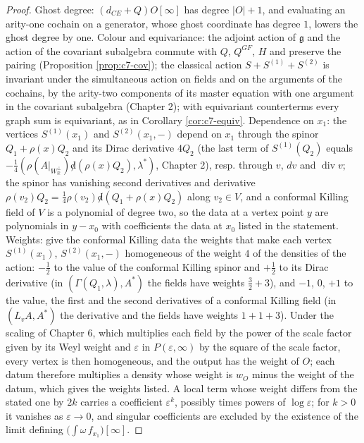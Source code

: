 \begin{proof}
Ghost degree: $(d_{CE}+Q)O[\infty]$ has degree $|O|+1$, and evaluating an arity-one cochain on a generator, whose ghost coordinate has degree $1$, lowers the ghost degree by one. Colour and equivariance: the adjoint action of $\mathfrak g$ and the action of the covariant subalgebra commute with $Q$, $Q^{GF}$, $H$ and preserve the pairing (Proposition \ref{prop:c7-cov}); the classical action $S+S^{(1)}+S^{(2)}$ is invariant under the simultaneous action on fields and on the arguments of the cochains, by the arity-two components of its master equation with one argument in the covariant subalgebra (Chapter 2); with equivariant counterterms every graph sum is equivariant, as in Corollary \ref{cor:c7-equiv}. Dependence on $x_1$: the vertices $S^{(1)}(x_1)$ and $S^{(2)}(x_1,-)$ depend on $x_1$ through the spinor $Q_1+\rho(x)Q_2$ and its Dirac derivative $4Q_2$ (the last term of $S^{(1)}(Q_2)$ equals $-\tfrac14(\rho(A|_{W_{\mathbb R}^\perp}){\not d}(\rho(x)Q_2),\lambda^*)$, Chapter 2), resp. through $v$, $dv$ and $\operatorname{div}v$; the spinor has vanishing second derivatives and derivative $\rho(v_2)Q_2=\tfrac14\rho(v_2){\not d}(Q_1+\rho(x)Q_2)$ along $v_2\in V$, and a conformal Killing field of $V$ is a polynomial of degree two, so the data at a vertex point $y$ are polynomials in $y-x_0$ with coefficients the data at $x_0$ listed in the statement. Weights: give the conformal Killing data the weights that make each vertex $S^{(1)}(x_1)$, $S^{(2)}(x_1,-)$ homogeneous of the weight $4$ of the densities of the action: $-\tfrac12$ to the value of the conformal Killing spinor and $+\tfrac12$ to its Dirac derivative (in $(\Gamma(Q_1,\lambda),A^*)$ the fields have weights $\tfrac32+3$), and $-1$, $0$, $+1$ to the value, the first and the second derivatives of a conformal Killing field (in $(L_vA,A^*)$ the derivative and the fields have weights $1+1+3$). Under the scaling of Chapter 6, which multiplies each field by the power of the scale factor given by its Weyl weight and $\varepsilon$ in $P(\varepsilon,\infty)$ by the square of the scale factor, every vertex is then homogeneous, and the output has the weight of $O$; each datum therefore multiplies a density whose weight is $w_O$ minus the weight of the datum, which gives the weights listed. A local term whose weight differs from the stated one by $2k$ carries a coefficient $\varepsilon^{k}$, possibly times powers of $\log\varepsilon$; for $k>0$ it vanishes as $\varepsilon\to0$, and singular coefficients are excluded by the existence of the limit defining $\big(\int\omega\,f_{x_1}\big)[\infty]$.
\end{proof}

